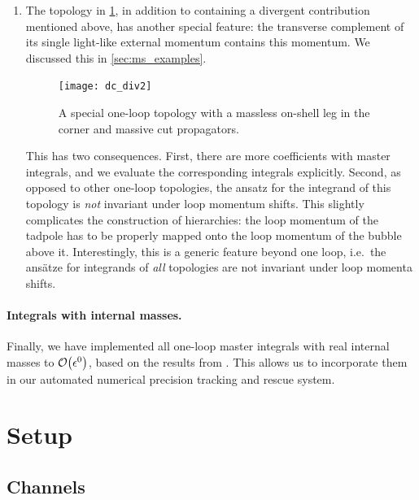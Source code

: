 \begin{enumerate}
  \item The topology in \cref{fig:dc_div2}, in addition to containing a divergent contribution mentioned above,
    has another special feature: the transverse complement of its single light-like external momentum contains this momentum.
    We discussed this in \cref{sec:ms_examples}.
    \begin{figure}[h]
      \centering
      \texttt{[image: dc\_div2]}
      \caption{A special one-loop topology with a massless on-shell leg in the corner and massive cut propagators.}
      \label{fig:dc_div2}
    \end{figure}
    This has two consequences. First, there are more coefficients with master integrals, and we evaluate the corresponding integrals explicitly.
    Second, as opposed to other one-loop topologies, the ansatz for the integrand of this topology is \emph{not} invariant under loop momentum shifts.
    This slightly complicates the construction of hierarchies:
    the loop momentum of the tadpole has to be properly mapped onto the loop momentum of the bubble above it.
    Interestingly, this is a generic feature beyond one loop, i.e.\ the ansätze for integrands of \emph{all} topologies are not invariant under loop momenta shifts.
\end{enumerate}


\paragraph{Integrals with internal masses.} Finally,
we have implemented all one-loop master integrals with real internal masses to $\order{\epsilon^0} $, based
on the results from \cite{Carrazza:2016gav,vanHameren:2010cp}. This allows us to incorporate
them in our automated numerical precision tracking and rescue system.


\section{Setup}
\label{sec:wbb:setup}

\subsection{Channels}
\label{sec:calcsetup}

